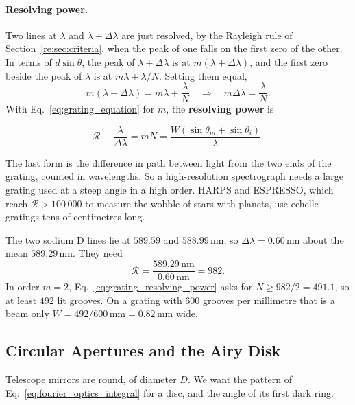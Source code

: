 \paragraph{Resolving power.} Two lines at $\lambda$ and $\lambda+\Delta\lambda$ are just resolved, by the Rayleigh rule of Section~\ref{re:sec:criteria}, when the peak of one falls on the first zero of the other. In terms of $d\sin\theta$, the peak of $\lambda+\Delta\lambda$ is at $m(\lambda+\Delta\lambda)$, and the first zero beside the peak of $\lambda$ is at $m\lambda+\lambda/N$. Setting them equal,
\begin{equation}
	m(\lambda + \Delta\lambda) = m\lambda + \frac{\lambda}{N} \quad\Longrightarrow\quad m\Delta\lambda = \frac{\lambda}{N}.
\end{equation}
With Eq.~\eqref{eq:grating_equation} for $m$, the \textbf{resolving power} is
\begin{keyresult}
	\begin{equation}
		\mathcal{R} \equiv \frac{\lambda}{\Delta\lambda} = m N = \frac{W\left(\sin\theta_m + \sin\theta_i\right)}{\lambda}.
		\label{eq:grating_resolving_power}
	\end{equation}
\end{keyresult}
The last form is the difference in path between light from the two ends of the grating, counted in wavelengths. So a high-resolution spectrograph needs a large grating used at a steep angle in a high order. HARPS and ESPRESSO, which reach $\mathcal R>100\,000$ to measure the wobble of stars with planets, use echelle gratings tens of centimetres long.

\begin{example}
	The two sodium D lines lie at $589.59$ and $588.99\,\mathrm{nm}$, so $\Delta\lambda=0.60\,\mathrm{nm}$ about the mean $589.29\,\mathrm{nm}$. They need
	\[
	\mathcal R = \frac{589.29\,\mathrm{nm}}{0.60\,\mathrm{nm}} = 982 .
	\]
	In order $m=2$, Eq.~\eqref{eq:grating_resolving_power} asks for $N\ge982/2=491.1$, so at least $492$ lit grooves. On a grating with $600$ grooves per millimetre that is a beam only $W=492/600\,\mathrm{mm}=0.82\,\mathrm{mm}$ wide.
\end{example}

\subsection{Circular Apertures and the Airy Disk}

Telescope mirrors are round, of diameter $D$. We want the pattern of Eq.~\eqref{eq:fourier_optics_integral} for a disc, and the angle of its first dark ring.

